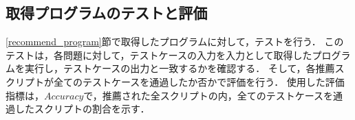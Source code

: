   \subsection{取得プログラムのテストと評価\label{test_and_evaluation}}
    \ref{recommend_program}節で取得したプログラムに対して，テストを行う．
    このテストは，各問題に対して，テストケースの入力を入力として取得したプログラムを実行し，テストケースの出力と一致するかを確認する．
    そして，各推薦スクリプトが全てのテストケースを通過したか否かで評価を行う．
    使用した評価指標は，$Accuracy$で，推薦された全スクリプトの内，全てのテストケースを通過したスクリプトの割合を示す．


